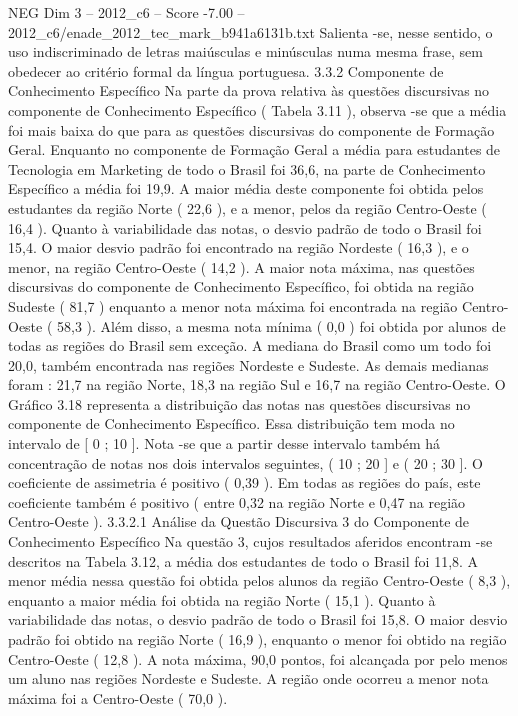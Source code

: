 \begin{textsample}{NEG Dim 3 – 2012\_c6 – Score -7.00 – 2012\_c6/enade\_2012\_tec\_mark\_b941a6131b.txt}
Salienta -se, nesse sentido, o uso indiscriminado de letras maiúsculas e minúsculas numa mesma frase, sem obedecer ao critério formal da língua portuguesa. 3.3.2 Componente de Conhecimento Específico Na parte da prova relativa às questões discursivas no componente de Conhecimento Específico ( Tabela 3.11 ), observa -se que a média foi mais baixa do que para as questões discursivas do componente de Formação Geral.
Enquanto no componente de Formação Geral a média para estudantes de Tecnologia em Marketing de todo o Brasil foi 36,6, na parte de Conhecimento Específico a média foi 19,9.
A maior média deste componente foi obtida pelos estudantes da região Norte ( 22,6 ), e a menor, pelos da região Centro-Oeste ( 16,4 ).
Quanto à variabilidade das notas, o desvio padrão de todo o Brasil foi 15,4.
O maior desvio padrão foi encontrado na região Nordeste ( 16,3 ), e o menor, na região Centro-Oeste ( 14,2 ).
A maior nota máxima, nas questões discursivas do componente de Conhecimento Específico, foi obtida na região Sudeste ( 81,7 ) enquanto a menor nota máxima foi encontrada na região Centro-Oeste ( 58,3 ).
Além disso, a mesma nota mínima ( 0,0 ) foi obtida por alunos de todas as regiões do Brasil sem exceção.
A mediana do Brasil como um todo foi 20,0, também encontrada nas regiões Nordeste e Sudeste.
As demais medianas foram : 21,7 na região Norte, 18,3 na região Sul e 16,7 na região Centro-Oeste.
O Gráfico 3.18 representa a distribuição das notas nas questões discursivas no componente de Conhecimento Específico.
Essa distribuição tem moda no intervalo de [ 0 ; 10 ].
Nota -se que a partir desse intervalo também há concentração de notas nos dois intervalos seguintes, ( 10 ; 20 ] e ( 20 ; 30 ].
O coeficiente de assimetria é positivo ( 0,39 ).
Em todas as regiões do país, este coeficiente também é positivo ( entre 0,32 na região Norte e 0,47 na região Centro-Oeste ). 3.3.2.1 Análise da Questão Discursiva 3 do Componente de Conhecimento Específico Na questão 3, cujos resultados aferidos encontram -se descritos na Tabela 3.12, a média dos estudantes de todo o Brasil foi 11,8.
A menor média nessa questão foi obtida pelos alunos da região Centro-Oeste ( 8,3 ), enquanto a maior média foi obtida na região Norte ( 15,1 ).
Quanto à variabilidade das notas, o desvio padrão de todo o Brasil foi 15,8.
O maior desvio padrão foi obtido na região Norte ( 16,9 ), enquanto o menor foi obtido na região Centro-Oeste ( 12,8 ).
A nota máxima, 90,0 pontos, foi alcançada por pelo menos um aluno nas regiões Nordeste e Sudeste.
A região onde ocorreu a menor nota máxima foi a Centro-Oeste ( 70,0 ).

\end{textsample}
